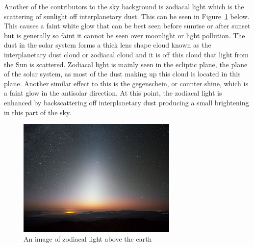 			Another of the contributors to the sky background is zodiacal light which is the scattering of sunlight off interplanetary dust\cite[p.~5--6]{MNRMNR21602}. This can be seen in Figure~\ref{fig:zodiacal_light} below. This causes a faint white glow that can be best seen before sunrise or after sunset but is generally so faint it cannot be seen over moonlight or light pollution. The dust in the solar system forms a thick lens shape cloud known as the interplanetary dust cloud or zodiacal cloud and it is off this cloud that light from the Sun is scattered. Zodiacal light is mainly seen in the ecliptic plane, the plane of the solar system, as most of the dust making up this cloud is located in this plane. Another similar effect to this is the gegenschein, or counter shine, which is a faint glow in the antisolar direction\cite{Observational_Studies_of_Interplanetary_Dust}. At this point, the zodiacal light is enhanced by backscattering off interplanetary dust producing a small brightening in this part of the sky.
			\begin{figure}[!htbp]
				\centering
				\includegraphics[width=0.7\textwidth]{../Images/zodiacal_light.jpeg}
				\caption{An image of zodiacal light above the earth}\label{fig:zodiacal_light}
			\end{figure}

